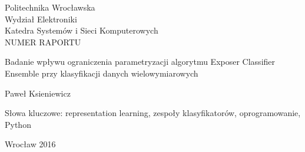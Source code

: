 \begin{titlepage}

\begin{center}
	\large Politechnika Wrocławska\\
	Wydział Elektroniki\\
	Katedra Systemów i Sieci Komputerowych\\
	NUMER RAPORTU	
\end{center}

\vspace*{7cm}
\hspace*{6cm}\parbox[p]{10cm}
{\large Badanie wpływu ograniczenia parametryzacji algorytmu Exposer Classifier Ensemble przy klasyfikacji danych wielowymiarowych}
\vspace*{1cm}

\hspace*{6cm}\large Paweł Ksieniewicz

\vspace*{4cm}

\hspace*{6cm}\parbox{10cm}{\large Słowa kluczowe: representation learning, zespoły klasyfikatorów, oprogramowanie, Python}

\vspace*{5cm}

\begin{center}
	Wrocław 2016
\end{center}
\end{titlepage}
